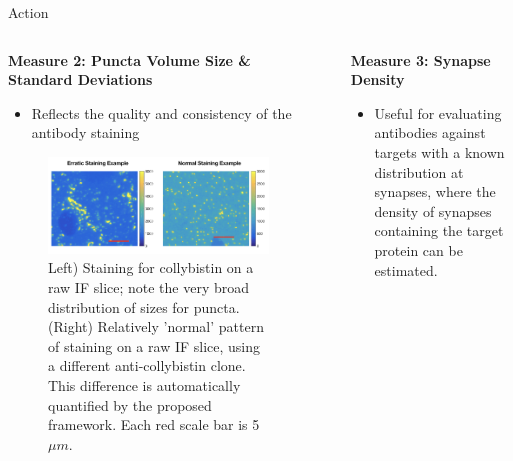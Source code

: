 \documentclass[final, table]{beamer}
\newlength{\sepwid}
\newlength{\onecolwid}
\newlength{\twocolwid}
\begin{document}
\begin{frame}[t]
\begin{columns}[t]
\begin{column}{\twocolwid}
\begin{block}{Action}
\begin{columns}[t]
\begin{column}{\onecolwid}
\textbf{Measure 2: Puncta Volume Size \& Standard Deviations} 

\begin{itemize} 
\item Reflects the quality and consistency of the antibody staining
\end{itemize} 


\begin{figure}
\centering
\includegraphics[width=1\textwidth]{figs/ab_sizevariance}
\caption{Left) Staining for collybistin on a raw IF slice; note the very broad distribution of sizes for puncta. (Right) Relatively 'normal' pattern of staining on a raw IF slice, using a different anti-collybistin clone.  This difference is automatically quantified by the proposed framework. Each red scale bar is 5$\mu m$.} 

\end{figure}




\end{column}


\begin{column}{\sepwid}\end{column}  %
\begin{column}{\onecolwid}

\textbf{Measure 3: Synapse Density} 
\begin{itemize} 
\item Useful for evaluating antibodies against targets with a known distribution at synapses, where the density of synapses containing the target protein can be estimated.
\end{itemize} 



\end{column}
\end{columns}
\end{block}
\end{column}
\end{columns}
\end{frame}
\end{document}
